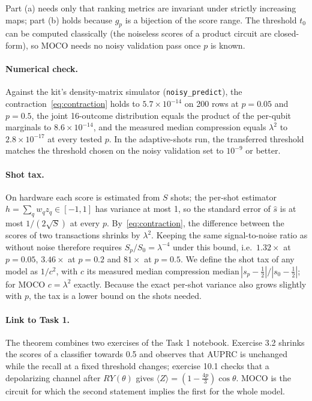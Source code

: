 \documentclass[10pt,twocolumn]{article}
\theoremstyle{definition}
\newcommand{\ex}[1]{\langle #1\rangle}
\begin{document}
Part (a) needs only that ranking metrics are invariant under strictly increasing maps; part (b) holds because
$g_p$ is a bijection of the score range. The threshold $t_0$ can be computed classically (the noiseless scores of
a product circuit are closed-form), so MOCO needs no noisy validation pass once $p$ is known.

\paragraph{Numerical check.} Against the kit's density-matrix simulator (\texttt{noisy\_predict}), the
contraction~\eqref{eq:contraction} holds to $5.7\times10^{-14}$ on 200 rows at $p=0.05$ and $p=0.5$, the joint
16-outcome distribution equals the product of the per-qubit marginals to $8.6\times10^{-14}$, and the measured
median compression equals $\lambda^2$ to $2.8\times10^{-17}$ at every tested $p$. In the adaptive-shots run, the
transferred threshold matches the threshold chosen on the noisy validation set to $10^{-9}$ or better.

\paragraph{Shot tax.} On hardware each score is estimated from $S$ shots; the per-shot estimator
$h=\sum_q w_q z_q\in[-1,1]$ has variance at most 1, so the standard error of $\hat s$ is at most
$1/(2\sqrt S)$ at every $p$. By~\eqref{eq:contraction}, the difference between the scores of two transactions
shrinks by $\lambda^2$. Keeping the same signal-to-noise ratio as without noise therefore requires
$S_p/S_0=\lambda^{-4}$ under this bound, i.e.\ $1.32\times$ at $p=0.05$, $3.46\times$ at $p=0.2$ and $81\times$
at $p=0.5$. We define the shot tax of any model as $1/c^2$, with $c$ its measured median compression
$\mathrm{median}\,|s_p-\tfrac12|/|s_0-\tfrac12|$; for MOCO $c=\lambda^2$ exactly. Because the exact per-shot
variance also grows slightly with $p$, the tax is a lower bound on the shots needed.

\paragraph{Link to Task 1.} The theorem combines two exercises of the Task 1 notebook. Exercise 3.2 shrinks the
scores of a classifier towards 0.5 and observes that AUPRC is unchanged while the recall at a fixed threshold
changes; exercise 10.1 checks that a depolarizing channel after $RY(\theta)$ gives
$\ex Z=(1-\tfrac{4p}3)\cos\theta$. MOCO is the circuit for which the second statement implies the first for the
whole model.
\end{document}
